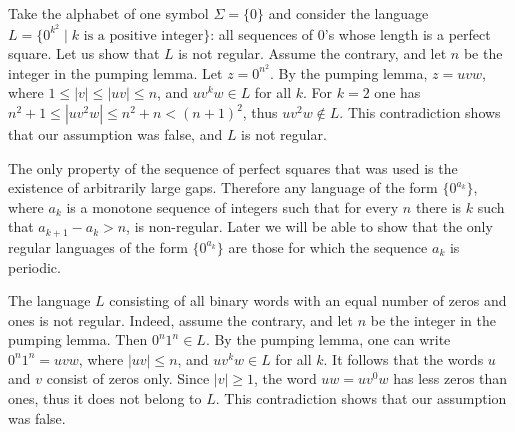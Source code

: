 \begin{page}
\setcounter{section}{3}
\setcounter{subsection}{2}
\setcounter{dfn}{5}
\label{portion:1127}

\begin{exl}
Take the alphabet of one symbol $\Sigma = \{0\}$
and consider the language $L = \{0^{k^2} \mid k \text{ is a positive integer}\}$:
all sequences of $0$'s whose length is a perfect square.
Let us show that $L$ is not regular. Assume the contrary, and let $n$ be the integer in the pumping lemma.
Let $z = 0^{n^2}$. By the pumping lemma, $z = uvw$, where $1 \le |v| \le |uv| \le n$, and $uv^kw \in L$ for all $k$.
For $k=2$ one has $n^2+1 \le |uv^2w| \le n^2 + n < (n+1)^2$, thus $uv^2w \notin L$.
This contradiction shows that our assumption was false, and $L$ is not regular.
\end{exl}

\end{page}

\begin{page}
\setcounter{section}{3}
\setcounter{subsection}{2}
\setcounter{dfn}{5}
\label{portion:1128}


The only property of the sequence of perfect squares that was used is the existence of arbitrarily large gaps.
Therefore any language of the form $\{0^{a_k}\}$,
where $a_k$ is a monotone sequence of integers such that for every $n$ there is $k$ such that $a_{k+1} - a_k > n$, is non-regular.
Later we will be able to show that the only regular languages of the form $\{0^{a_k}\}$ are those for which the sequence $a_k$ is periodic.


\end{page}

\begin{page}
\setcounter{section}{3}
\setcounter{subsection}{2}
\setcounter{dfn}{6}
\label{portion:1130}

\begin{exl}
The language $L$ consisting of all binary words with an equal number of zeros and ones is not regular.
Indeed, assume the contrary, and let $n$ be the integer in the pumping lemma.
Then $0^n1^n \in L$.
By the pumping lemma, one can write $0^n1^n = uvw$, where $|uv| \le n$, and $uv^kw \in L$ for all $k$.
It follows that the words $u$ and $v$ consist of zeros only.
Since $|v| \ge 1$, the word $uw = uv^0w$ has less zeros than ones, thus it does not belong to $L$.
This contradiction shows that our assumption was false.
\end{exl}

\end{page}

